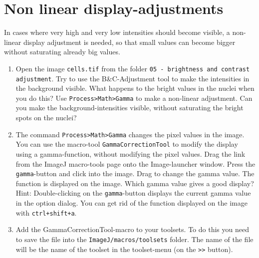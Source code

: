 \section{Non linear display-adjustments}

In cases where very high and very low intensities should become visible, a non-linear display
adjustment is needed, so that small values can become bigger without saturating already big values.

\begin{enumerate}

\item Open the image \texttt{cells.tif} from the folder \texttt{05 - brightness and contrast adjustment}. Try to use the B\&C-Adjustment tool to make the intensities in the background visible. What happens
to the bright values in the nuclei when you do this? Use \texttt{Process>Math>Gamma} to make a non-linear adjustment. Can you make the background-intensities visible, without saturating the bright spots on the nuclei?

\fbox{
	\begin{minipage}{\linewidth}
		\hfill\vspace{2cm}
	\end{minipage}
	}
	
\item The command \texttt{Process>Math>Gamma} changes the pixel values in the image. You can use the macro-tool \texttt{GammaCorrectionTool} to modify the display using a gamma-function, without modifying the pixel values. Drag the link from the ImageJ macro-tools page onto the Image-launcher window. Press the \texttt{gamma}-button and click into the image. Drag to change the gamma value. The function is displayed on the image. Which gamma value gives a good display? Hint: Double-clicking on the \texttt{gamma}-button displays the current gamma value in the option dialog. You can get rid of the function displayed on the image with \texttt{ctrl+shift+a}.

\fbox{
	\begin{minipage}{\linewidth}
		\hfill\vspace{1cm}
	\end{minipage}
	}
	
\item Add the GammaCorrectionTool-macro to your toolsets. To do this you need to save the file into the \texttt{ImageJ/macros/toolsets} folder. The name of the file will be the name of the toolset in the toolset-menu (on the \texttt{>>} button).

\end{enumerate}

